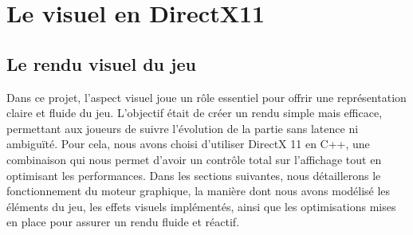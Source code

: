 \section{Le visuel en DirectX11}

\subsection{Le rendu visuel du jeu}
Dans ce projet, l’aspect visuel joue un rôle essentiel pour offrir une représentation claire et fluide du jeu. L’objectif était de créer un rendu simple mais efficace, permettant aux joueurs de suivre l’évolution de la partie sans latence ni ambiguïté. Pour cela, nous avons choisi d’utiliser DirectX 11 en C++, une combinaison qui nous permet d’avoir un contrôle total sur l’affichage tout en optimisant les performances.
Dans les sections suivantes, nous détaillerons le fonctionnement du moteur graphique, la manière dont nous avons modélisé les éléments du jeu, les effets visuels implémentés, ainsi que les optimisations mises en place pour assurer un rendu fluide et réactif.

